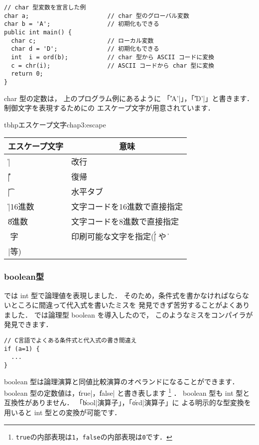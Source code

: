 \begin{mylist}
\begin{verbatim}
// char 型変数を宣言した例
char a;                      // char 型のグローバル変数
char b = 'A';                // 初期化もできる
public int main() {
  char c;                    // ローカル変数
  char d = 'D';              // 初期化もできる
  int  i = ord(b);           // char 型から ASCII コードに変換
  c = chr(i);                // ASCII コードから char 型に変換
  return 0;
}
\end{verbatim}
\end{mylist}

char 型の定数は，
上のプログラム例にあるように 「\|'A'|」，「\|'D'|」と書きます．
制御文字を表現するためにの
エスケープ文字が用意されています．

\begin{mytable}{tbhp}{エスケープ文字}{chap3:escape}
\begin{tabular}{ll}
\hline
\multicolumn{1}{c}{エスケープ文字} & \multicolumn{1}{c}{意味} \\
\hline
\|\n| & 改行 \\
\|\r| & 復帰 \\
\|\t| & 水平タブ \\
\|\x|16進数 & 文字コードを16進数で直接指定 \\
\|\|8進数 & 文字コードを8進数で直接指定 \\
\|\|文字 & 印刷可能な文字を指定(\|\'| や \|\\|等) \\
\hline
\end{tabular}
\end{mytable}

\subsubsection{boolean型}

\cl では int 型で論理値を表現しました．
そのため，条件式を書かなければならないところに間違って代入式を書いたミスを
発見できず苦労することがよくありました．
\cmml では論理型 boolean を導入したので，
このようなミスをコンパイラが発見できます．

\begin{mylist}
\begin{verbatim}
// C言語でよくある条件式と代入式の書き間違え
if (a=1) {
  ...
}
\end{verbatim}
\end{mylist}

boolean 型は論理演算と同値比較演算のオペランドになることができます．
boolean 型の定数値は，\|true|，\|false| と書き表します
\footnote{{\tt true}の内部表現は{\tt 1}，{\tt false}の内部表現は{\tt 0}です．}
．
boolean 型も int 型と互換性がありません．
「\|bool|演算子」，「\|ord|演算子」に
よる明示的な型変換を用いると int 型との変換が可能です．

